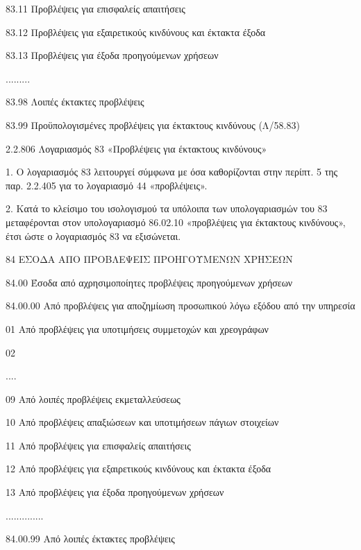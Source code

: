 \documentclass[A4,10pt,greek]{book}
\begin{document}
       83.11    Προβλέψεις για επισφαλείς απαιτήσεις

        83.12    Προβλέψεις για εξαιρετικούς κινδύνους και έκτακτα έξοδα

        83.13    Προβλέψεις για έξοδα προηγούμενων χρήσεων

        .........

        83.98    Λοιπές έκτακτες προβλέψεις

        83.99    Προϋπολογισμένες προβλέψεις για έκτακτους κινδύνους (Λ/58.83)

2.2.806 Λογαριασμός 83 «Προβλέψεις για έκτακτους κινδύνους»

1. Ο λογαριασμός 83 λειτουργεί σύμφωνα με όσα καθορίζονται στην περίπτ. 5 της παρ. 2.2.405 για το λογαριασμό 44 «προβλέψεις».

2. Κατά το κλείσιμο του ισολογισμού τα υπόλοιπα των υπολογαριασμών του 83 μεταφέρονται στον υπολογαριασμό 86.02.10 «προβλέψεις για έκτακτους κινδύνους», έτσι ώστε ο λογαριασμός 83 να εξισώνεται.

84    ΕΣΟΔΑ ΑΠΟ ΠΡΟΒΛΕΨΕΙΣ ΠΡΟΗΓΟΥΜΕΝΩΝ ΧΡΗΣΕΩΝ

        84.00    Έσοδα από αχρησιμοποίητες προβλέψεις προηγούμενων χρήσεων

                     84.00.00    Από προβλέψεις για αποζημίωση προσωπικού λόγω εξόδου από
                                       την υπηρεσία

                               01    Από προβλέψεις για υποτιμήσεις συμμετοχών και χρεογράφων

                               02

                               ....

                               09    Από λοιπές προβλέψεις εκμεταλλεύσεως

                               10    Από προβλέψεις απαξιώσεων και υποτιμήσεων πάγιων
                                       στοιχείων

                               11    Από προβλέψεις για επισφαλείς απαιτήσεις

                               12    Από προβλέψεις για εξαιρετικούς κινδύνους και έκτακτα έξοδα

                               13    Από προβλέψεις για έξοδα προηγούμενων χρήσεων

                     ..............

                     84.00.99    Από λοιπές έκτακτες προβλέψεις
\end{document}
